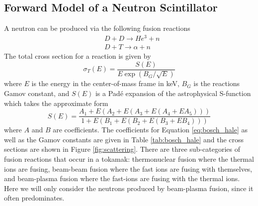 \subsection{Forward Model of a Neutron Scintillator}
A neutron can be produced via the following fusion reactions
\begin{equation}\label{eq:D_D}
\begin{split}
    &D + D \rightarrow He^3 + n\\
    &D + T \rightarrow \alpha + n
\end{split}
\end{equation}
The total cross section for a reaction is given by
\begin{equation}
        \sigma_T(E) = \frac{S(E)}{E\exp(B_G/\sqrt{E})}
\end{equation}
where $E$ is the energy in the center-of-mass frame in keV, $B_G$ is the reactions Gamov constant, and $S(E)$ is a Pad\'{e} expansion of the astrophysical S-function which takes the approximate form\cite{bosch1992,mfeformulary}
\begin{equation}\label{eq:bosch_hale}
    S(E) = \frac{A_1 + E(A_2 + E(A_3 + E(A_4 + E A_5)))}{1 + E(B_1 + E(B_2 + E(B_3 + E B_4)))}
\end{equation}
where $A$ and $B$ are coefficients. The coefficients for Equation \ref{eq:bosch_hale} as well as the Gamov constants are given in Table \ref{tab:bosch_hale} and the cross sections are shown in Figure \ref{fig:scattering}.
There are three sub-categories of fusion reactions that occur in a tokamak: thermonuclear fusion where the thermal ions are fusing, beam-beam fusion where the fast ions are fusing with themselves, and beam-plasma fusion where the fast-ions are fusing with the thermal ions. Here we will only consider the neutrons produced by beam-plasma fusion, since it often predominates.
